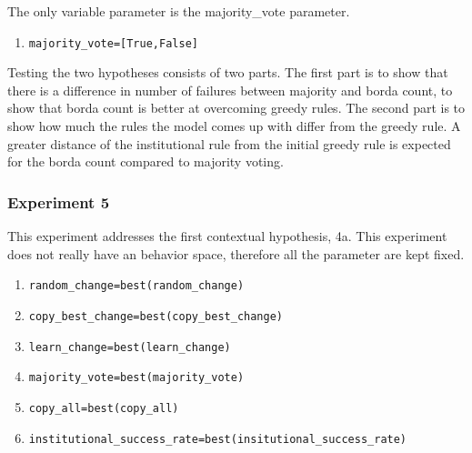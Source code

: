 \documentclass[a4paper]{article}
\begin{document}
The only variable parameter is the majority\_vote parameter.
\begin{enumerate}
 \item  \begin{alltt} majority_vote = [True, False] \end{alltt}
\end{enumerate}


Testing the two hypotheses consists of two parts. The first part is to show that there 
is a difference in number of failures between majority and borda count, to show that
borda count is better at overcoming greedy rules. The second part is to show how much the rules
the model comes up with differ from the greedy rule. A greater distance of the institutional rule 
from the initial greedy rule is expected for the borda count compared to majority voting. 

\subsubsection{Experiment 5}
This experiment addresses the first contextual hypothesis, 4a. This experiment does not really have 
an behavior space, therefore all the parameter are kept fixed. 
\begin{enumerate}
 \item \begin{alltt}random_change  = best(random_change)\end{alltt}
 \item \begin{alltt}copy_best_change = best(copy_best_change)\end{alltt}
 \item \begin{alltt}learn_change = best(learn_change)\end{alltt}
 \item \begin{alltt}majority_vote = best(majority_vote)\end{alltt}
 \item \begin{alltt}copy_all = best(copy_all)\end{alltt}
 \item \begin{alltt}institutional_success_rate = best(insitutional_success_rate)\end{alltt}
\end{enumerate}
\end{document}
